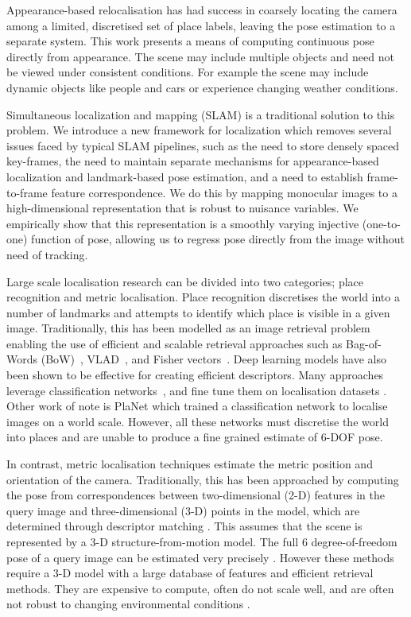 Appearance-based relocalisation has had success \citep{cummins2008fab,sunderhauf2015performance} in coarsely locating the camera among a limited, discretised set of place labels, leaving the pose estimation to a separate system. This work presents a means of computing continuous pose directly from appearance. The scene may include multiple objects and need not be viewed under consistent conditions. For example the scene may include dynamic objects like people and cars or experience changing weather conditions. 

Simultaneous localization and mapping (SLAM) is a traditional solution to this problem. We introduce a new framework for localization which removes several issues faced by typical SLAM pipelines, such as the need to store densely spaced key-frames, the need to maintain separate mechanisms for appearance-based localization and landmark-based pose estimation, and a need to establish frame-to-frame feature correspondence. We do this by mapping monocular images to a high-dimensional representation that is robust to nuisance variables. We empirically show that this representation is a smoothly varying injective (one-to-one) function of pose, allowing us to regress pose directly from the image without need of tracking.

Large scale localisation research can be divided into two categories; place recognition and metric localisation. Place recognition discretises the world into a number of landmarks and attempts to identify which place is visible in a given image. Traditionally, this has been modelled as an image retrieval problem \citep{chen2011city,cummins2008fab,Torii13CVPR,Schindler07CVPR} enabling the use of efficient and scalable retrieval approaches \citep{Nister06CVPR,Philbin07CVPR} such as Bag-of-Words (BoW)~\citep{Sivic03ICCV}, VLAD~\citep{Jegou-CVPR10,Delhumeau-ACMMM13}, and Fisher vectors~\citep{Jegou-PAMI12}. Deep learning models have also been shown to be effective for creating efficient descriptors. Many approaches leverage classification networks~\citep{RSMC14,GWGL14,BL15,Tolias16ICLR}, and fine tune them on localisation datasets \citep{BSCL14}. Other work of note is PlaNet \citep{weyand2016planet} which trained a classification network to localise images on a world scale. However, all these networks must discretise the world into places and are unable to produce a fine grained estimate of 6-DOF pose.

In contrast, metric localisation techniques estimate the metric position and orientation of the camera. Traditionally, this has been approached by computing the pose from correspondences between two-dimensional (2-D) features in the query image and three-dimensional (3-D) points in the model, which are determined through descriptor matching \citep{Choudhary12ECCV,li2010location,li2012worldwide,Sattler12ECCV,svarm2014accurate}. This assumes that the scene is represented by a 3-D structure-from-motion model. The full 6 degree-of-freedom pose of a query image can be estimated very precisely \citep{Sattler14ECCV}. However these methods require a 3-D model with a large database of features and efficient retrieval methods. They are expensive to compute, often do not scale well, and are often not robust to changing environmental conditions \citep{walch2016image}.

